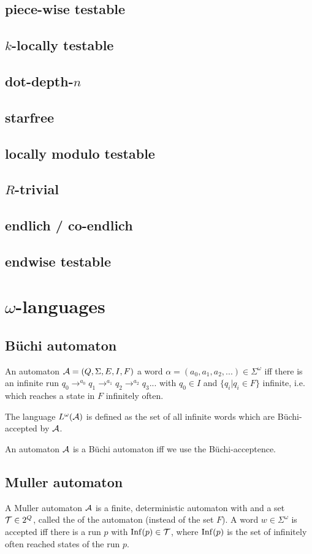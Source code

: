 \subsection{piece-wise testable}
\subsection{$k$-locally testable}
\subsection{dot-depth-$n$}
\subsection{starfree}
\subsection{locally modulo testable}
\subsection{$R$-trivial}
\subsection{endlich / co-endlich}
\subsection{endwise testable}

\section{$\omega$-languages}
\subsection{Büchi automaton}
An automaton $\mathcal{A} = (Q, \Sigma, E, I, F)$  a word $\alpha = (a_0,a_1,a_2,...) \in \Sigma^\omega$ iff there is an infinite run $q_0 \rightarrow^{a_0} q_1 \rightarrow^{a_1} q_2 \rightarrow^{a_2} q_3 ...$ with $q_0 \in I$ and $\{ q_i | q_i \in F \}$ infinite, i.e. which reaches a state in $F$ infinitely often.

The language $L^\omega(\mathcal{A})$ is defined as the set of all infinite words which are Büchi-accepted by  $\mathcal{A}$.

An automaton $\mathcal{A}$ is a Büchi automaton iff we use the Büchi-acceptence.

\subsection{Muller automaton}
A Muller automaton $\mathcal{A}$ is a finite, deterministic automaton with  and a set $\mathcal{T} \in 2^Q$, called the  of the automaton (instead of the set $F$). A word $w \in \Sigma^\omega$ is accepted iff there is a run $p$ with $\operatorname{Inf}(p) \in \mathcal{T}$, where $\operatorname{Inf}(p)$ is the set of infinitely often reached states of the run $p$.

